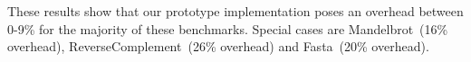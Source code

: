 These results show that our prototype implementation poses an overhead between 0-9\% for the majority of these benchmarks. Special cases are Mandelbrot~(16\% overhead), ReverseComplement~(26\% overhead) and Fasta~(20\% overhead).

